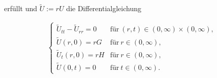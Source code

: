 \begin{exercise}
erfüllt und $\tilde U := r U$ die Differentialgleichung

\begin{align*}
    \begin{cases}
        \tilde U_{tt} - \tilde U_{rr} = 0 & \text{für}~ (r, t) \in (0, \infty) \times (0, \infty), \\
        \tilde U(r, 0) = r G              & \text{für}~ r \in (0, \infty), \\
        \tilde U_t(r, 0) = r H            & \text{für}~ r \in (0, \infty), \\
        \tilde U(0, t) = 0                & \text{für}~ t \in (0, \infty).
    \end{cases}
\end{align*}

\end{exercise}


